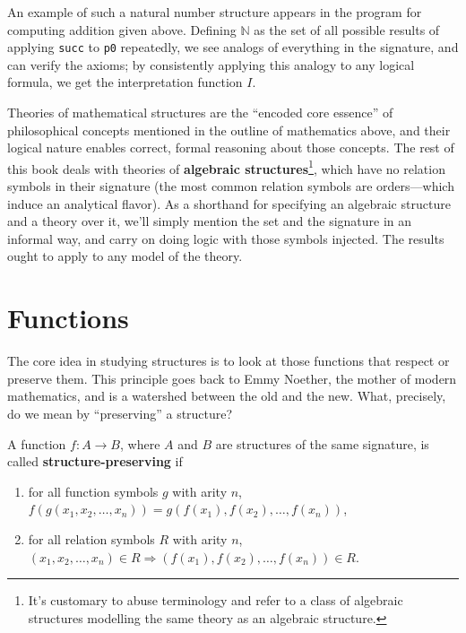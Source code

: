 An example of such a natural number structure appears in the program for computing addition given above.
Defining $\mathbb{N}$ as the set of all possible results of applying \verb|succ| to \verb|p0| repeatedly,
we see analogs of everything in the signature, and can verify the axioms;
by consistently applying this analogy to any logical formula, we get the interpretation function $I$.

Theories of mathematical structures are the ``encoded core essence'' of philosophical concepts mentioned in the outline of mathematics above,
and their logical nature enables correct, formal reasoning about those concepts.
The rest of this book deals with theories of \textbf{algebraic structures}\footnote
{
  It's customary to abuse terminology and refer to a class of algebraic structures modelling the same theory as an algebraic structure.
},
which have no relation symbols in their signature (the most common relation symbols are orders---which induce an analytical flavor).
As a shorthand for specifying an algebraic structure and a theory over it, we'll simply mention the set and the signature in an informal way,
and carry on doing logic with those symbols injected.
The results ought to apply to any model of the theory.

\section{Functions}

The core idea in studying structures is to look at those functions that respect or preserve them.
This principle goes back to Emmy Noether, the mother of modern mathematics, and is a watershed between the old and the new.
What, precisely, do we mean by ``preserving'' a structure?

\begin{definition}
  A function $f: A \to B$, where $A$ and $B$ are structures of the same signature, is called \textbf{structure-preserving} if
  \begin{enumerate}
  \item for all function symbols $g$ with arity $n$, $f(g(x_{1}, x_{2}, \ldots, x_{n})) = g(f(x_{1}), f(x_{2}), \ldots, f(x_{n}))$,
  \item for all relation symbols $R$ with arity $n$, $(x_{1}, x_{2}, \ldots, x_{n}) \in R \Rightarrow (f(x_{1}), f(x_{2}), \ldots, f(x_{n})) \in R$.
  \end{enumerate}
\end{definition}

